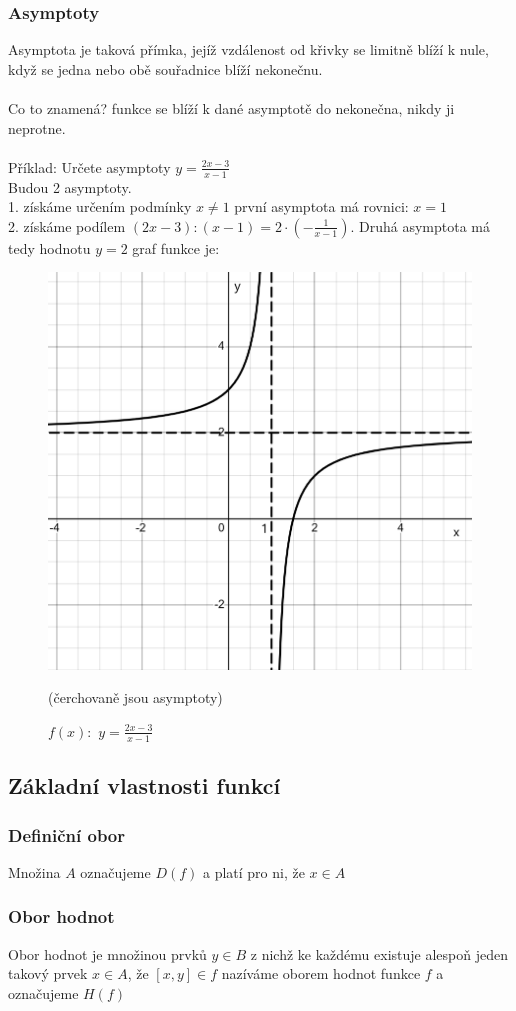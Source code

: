 \subsubsection{Asymptoty}
Asymptota je taková přímka, jejíž vzdálenost od křivky se limitně blíží k nule, když se jedna nebo obě souřadnice blíží nekonečnu. \\ \\
Co to znamená? funkce se blíží k dané asymptotě do nekonečna, nikdy ji neprotne.\\ \\
Příklad: Určete asymptoty $y=\frac{2x-3}{x-1}$\\
Budou 2 asymptoty. \\
1. získáme určením podmínky $x \neq 1$ první asymptota má rovnici: $x=1$ \\
2. získáme podílem $(2x-3):(x-1)=2\cdot(-\frac{1}{x-1})$. Druhá asymptota má tedy hodnotu $y=2$
graf funkce je:
\begin{figure}[H]
        \centering
        \includegraphics[width=0.5\linewidth]{img/2_lomena_fkce2.0.png}
        \caption{$f(x):$ $y=\frac{2x-3}{x-1}$} (čerchovaně jsou asymptoty)
        \label{fig:enter-label}
    \end{figure}
    

\subsection{Základní vlastnosti funkcí}
\subsubsection{Definiční obor}
Množina $A$ označujeme $D(f)$ a platí pro ni, že $x \in A$
\subsubsection{Obor hodnot}
Obor hodnot je množinou prvků $y \in B$ z nichž ke každému existuje alespoň jeden takový prvek $x\in A$, že $[x,y] \in f$ nazíváme oborem hodnot funkce $f$ a označujeme $H(f)$
